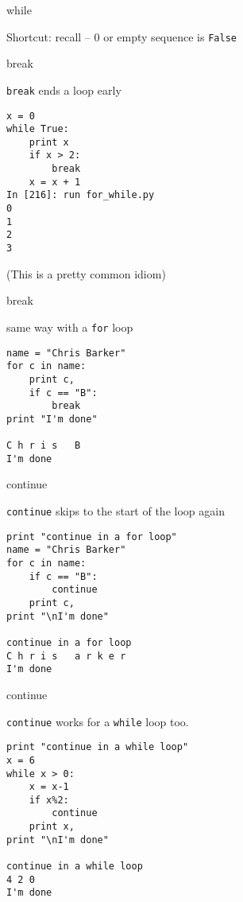\documentclass{beamer}
\begin{document}
\begin{frame}[fragile]{while}

{\Large Shortcut: recall -- 0 or empty sequence is \verb|False| }


\end{frame}


\begin{frame}[fragile]{break}

{\Large \verb|break| ends a loop early}

\begin{verbatim}
x = 0
while True:
    print x
    if x > 2:
        break
    x = x + 1
In [216]: run for_while.py
0
1
2
3
\end{verbatim}

\vfill
(This is a pretty common idiom)

\end{frame}

\begin{frame}[fragile]{break}

{\Large same way with a \verb|for| loop }

\begin{verbatim}
name = "Chris Barker"
for c in name:
    print c,
    if c == "B":
        break
print "I'm done"

C h r i s   B 
I'm done
\end{verbatim}
\end{frame}

\begin{frame}[fragile]{continue}

{\Large \verb|continue| skips to the start of the loop again}

\begin{verbatim}
print "continue in a for loop"
name = "Chris Barker"
for c in name:
    if c == "B":
        continue
    print c,
print "\nI'm done"

continue in a for loop
C h r i s   a r k e r 
I'm done
\end{verbatim}
\end{frame}

\begin{frame}[fragile]{continue}

{\Large \verb|continue| works for a \verb|while| loop too.}

\begin{verbatim}
print "continue in a while loop"
x = 6
while x > 0:
    x = x-1
    if x%2:
        continue
    print x,
print "\nI'm done"

continue in a while loop
4 2 0 
I'm done
\end{verbatim}
\end{frame}
\end{document}
